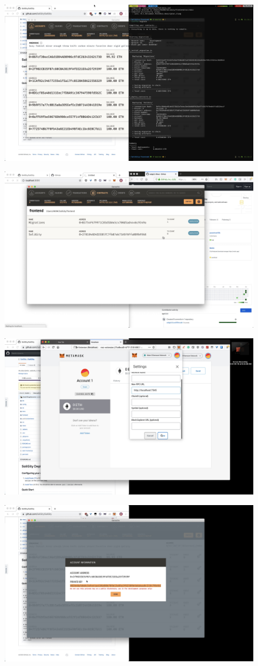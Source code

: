 \documentclass[12pt]{article}
\renewcommand{\_}{\kern-1.5pt\textunderscore\kern-1.5pt}
\begin{document}
\begin{enumerate}
	      \includegraphics[height=7cm]{graphs/07. truffle_migrate}

	      \includegraphics[height=7cm]{graphs/08. ganache_deployed_contract}

	      \includegraphics[height=7cm]{graphs/09. metamask_setup_network}

	      \includegraphics[height=7cm]{graphs/10. metamask_setup_bob}


\end{enumerate}
\end{document}
